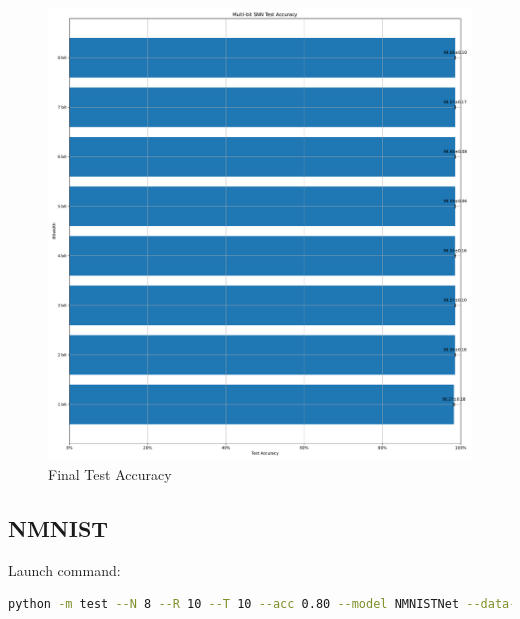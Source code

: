         \begin{figure}[H]
            \centering
            \includegraphics[width=\textwidth]{../standard/MNIST/plots/mnist_final_acc.pdf}
            \caption{Final Test Accuracy}
        \end{figure}
    
    \subsection{NMNIST}
    \label{appendix:accuracy_curves_nmnist}
        Launch command: 
        \begin{lstlisting}[language=Bash, basicstyle=\small, breaklines=true]
python -m test --N 8 --R 10 --T 10 --acc 0.80 --model NMNISTNet --data-path /scratch/zyi/codeSpace/data --dataset NMNIST --batch-size 128 --opt adam --lr 2e-3 --lr-scheduler none --epochs 5 --lr-warmup-epochs 0 --output-dir /scratch/zyi/codeSpace/MultibitSpikes --mixup-alpha 0.0 --cutmix-alpha 0.0 --label-smoothing 0.0 --disable-amp
        \end{lstlisting}

